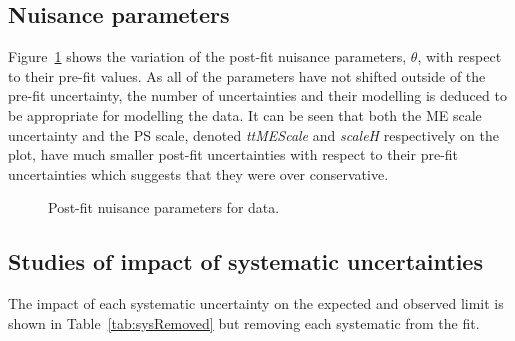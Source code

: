 \subsection{Nuisance parameters}

Figure~\ref{fig:datanuis} shows the variation of the post-fit nuisance parameters, $\theta$, with respect to their pre-fit values. As all of the parameters have not shifted outside of the pre-fit uncertainty, the number of uncertainties and their modelling is deduced to be appropriate for modelling the data. It can be seen that both the \ttbar ME scale uncertainty and the PS scale, denoted \emph{ttMEScale} and \emph{scaleH} respectively on the plot, have much smaller post-fit uncertainties with respect to their pre-fit uncertainties which suggests that they were over conservative.

\begin{figure}[h!]
\begin{center}
\hspace{0.2cm}
\end{center}
\caption{Post-fit nuisance parameters for data.}
\label{fig:datanuis}
\end{figure} 

\subsection{Studies of impact of systematic uncertainties}

The impact of each systematic uncertainty on the expected and observed limit is shown in Table~\ref{tab:sysRemoved} but removing each systematic from the fit.

